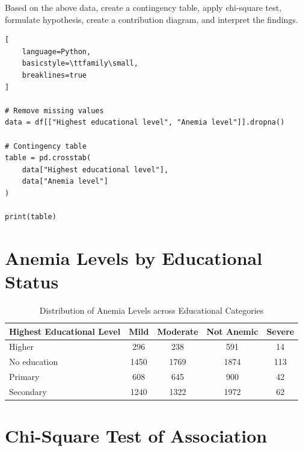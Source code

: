 \documentclass[12pt,a4paper]{report}
\begin{document}
Based on the above data, create a contingency table, apply chi-square test, formulate hypothesis, create a contribution diagram, and interpret the findings.

\begin{tcolorbox}[
    enhanced,
    colback=blue!3,
    colframe=blue!70!black,
    title=Education vs Anemia (Contingency Table),
    fonttitle=\bfseries,
    coltitle=white,
    colbacktitle=blue!70!black,
    arc=4pt,
    boxrule=1pt,
    breakable
]

\begin{lstlisting}[
    language=Python,
    basicstyle=\ttfamily\small,
    breaklines=true
]

# Remove missing values
data = df[["Highest educational level", "Anemia level"]].dropna()

# Contingency table
table = pd.crosstab(
    data["Highest educational level"],
    data["Anemia level"]
)

print(table)

\end{lstlisting}

\end{tcolorbox}
\section*{Anemia Levels by Educational Status}

\begin{table}[h!]
\centering
\caption{Distribution of Anemia Levels across Educational Categories}
\begin{tabular}{lcccc}
\hline
\textbf{Highest Educational Level} & \textbf{Mild} & \textbf{Moderate} & \textbf{Not Anemic} & \textbf{Severe} \\
\hline
Higher        & 296  & 238  & 591  & 14 \\
No education  & 1450 & 1769 & 1874 & 113 \\
Primary       & 608  & 645  & 900  & 42 \\
Secondary     & 1240 & 1322 & 1972 & 62 \\
\hline
\end{tabular}
\end{table}
\clearpage
\section*{Chi-Square Test of Association}
\end{document}
